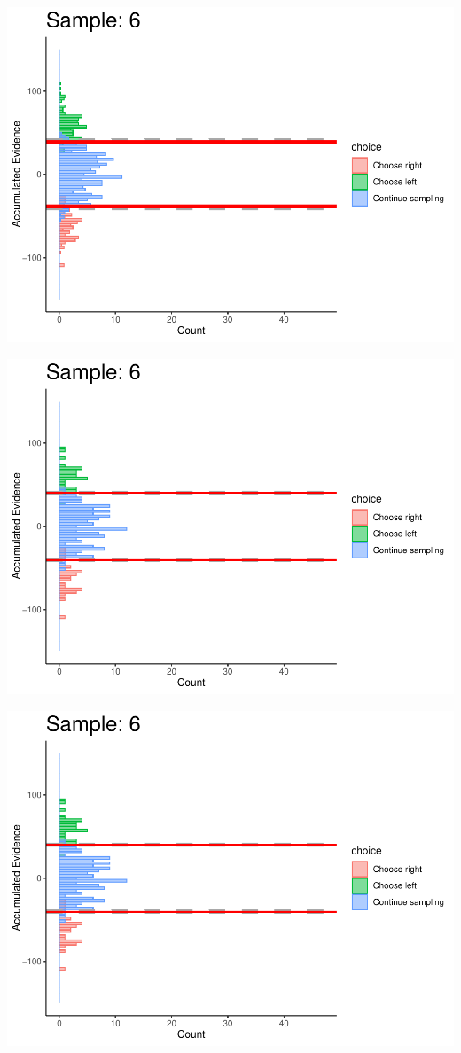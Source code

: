 \documentclass[
]{book}
\begin{document}
\begin{center}\includegraphics[width=0.8\linewidth]{LateNightBayes_files/figure-latex/collapsing_dcb-50} \end{center}

\begin{center}\includegraphics[width=0.8\linewidth]{LateNightBayes_files/figure-latex/collapsing_dcb-51} \end{center}

\begin{center}\includegraphics[width=0.8\linewidth]{LateNightBayes_files/figure-latex/collapsing_dcb-52} \end{center}
\end{document}
